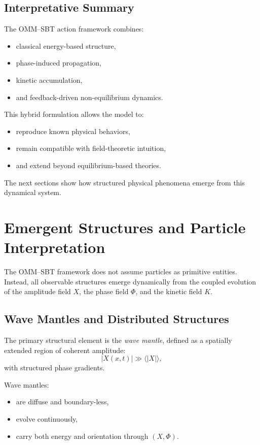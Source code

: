 \documentclass[11pt]{article}
\begin{document}
\subsection{Interpretative Summary}

The OMM--SBT action framework combines:

\begin{itemize}
\item classical energy-based structure,
\item phase-induced propagation,
\item kinetic accumulation,
\item and feedback-driven non-equilibrium dynamics.
\end{itemize}

This hybrid formulation allows the model to:
\begin{itemize}
\item reproduce known physical behaviors,
\item remain compatible with field-theoretic intuition,
\item and extend beyond equilibrium-based theories.
\end{itemize}

The next sections show how structured physical phenomena emerge from this dynamical system.

\section{Emergent Structures and Particle Interpretation}

The OMM--SBT framework does not assume particles as primitive entities. Instead, all observable structures emerge dynamically from the coupled evolution of the amplitude field $X$, the phase field $\Phi$, and the kinetic field $K$.

\subsection{Wave Mantles and Distributed Structures}

The primary structural element is the \emph{wave mantle}, defined as a spatially extended region of coherent amplitude:
\begin{equation}
|X(x,t)| \gg \langle |X| \rangle,
\end{equation}
with structured phase gradients.

Wave mantles:
\begin{itemize}
\item are diffuse and boundary-less,
\item evolve continuously,
\item carry both energy and orientation through $(X,\Phi)$.
\end{itemize}
\end{document}
